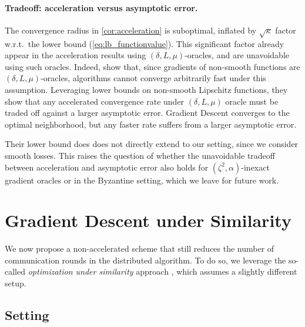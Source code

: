 \documentclass{article}
\theoremstyle{plain}
\theoremstyle{definition}
\theoremstyle{remark}
\begin{document}
\paragraph{Tradeoff: acceleration versus asymptotic error.}  The convergence radius in \cref{cor:acceleration} is suboptimal, inflated by $\sqrt{\kappa}$ factor w.r.t.~the lower bound (\ref{eq:lb_functionvalue}). This significant factor already appear in the acceleration results using $(\delta,L,\mu)$-oracles, and are unavoidable using such oracles. Indeed, \citet{devolder2014first} show that, since gradients of non-smooth functions are $(\delta,L,\mu)$-oracles, algorithms cannot converge arbitrarily fast under this assumption. Leveraging lower bounds on non-smooth Lipschitz functions, they show that any accelerated convergence rate under $(\delta,L,\mu)$ oracle must be traded off against a larger asymptotic error. Gradient Descent converges to the optimal neighborhood, but any faster rate suffers from a larger asymptotic error. 

Their lower bound does does not directly extend to our setting, since we consider smooth losses. This raises the question of whether the unavoidable tradeoff between acceleration and asymptotic error also holds for $(\zeta^2,\alpha)$-inexact gradient oracles or in the Byzantine setting, which we leave for future work.





\section{Gradient Descent under Similarity}
\label{sec:similarity}
We now propose a non-accelerated scheme that still reduces the number of communication rounds in the distributed algorithm. To do so, we leverage the so-called \textit{optimization under similarity} approach \citep{shamir2014communication, hendrikx2020statistically, kovalev2022optimal}, which assumes a slightly different setup.

\subsection{Setting}
\end{document}
